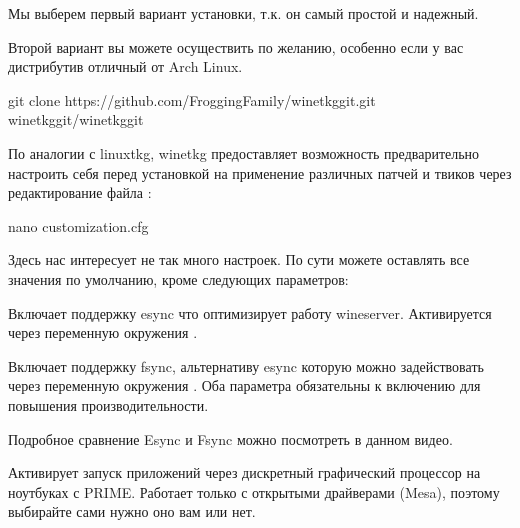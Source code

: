 \documentclass[letterpaper,10pt,russian,openany]{sphinxmanual}
\begin{document}
\sphinxAtStartPar
Мы выберем первый вариант установки, т.к. он самый простой и надежный.

\sphinxAtStartPar
Второй вариант вы можете осуществить по желанию, особенно если у вас дистрибутив отличный от Arch Linux.

\sphinxAtStartPar
{}

\begin{sphinxVerbatim}[commandchars=\\\{\}]
git clone https://github.com/Frogging\PYGZhy{}Family/wine\PYGZhy{}tkg\PYGZhy{}git.git
 wine\PYGZhy{}tkg\PYGZhy{}git/wine\PYGZhy{}tkg\PYGZhy{}git
\end{sphinxVerbatim}

\sphinxAtStartPar
По аналогии с linux\sphinxhyphen{}tkg, wine\sphinxhyphen{}tkg предоставляет возможность предварительно настроить себя перед установкой
на применение различных патчей и твиков через редактирование файла :

\begin{sphinxVerbatim}[commandchars=\\\{\}]
nano customization.cfg
\end{sphinxVerbatim}

\sphinxAtStartPar
Здесь нас интересует не так много настроек.
По сути можете оставлять все значения по умолчанию, кроме следующих параметров:

\sphinxAtStartPar
{} \sphinxhyphen{} Включает поддержку esync что оптимизирует работу wineserver.
Активируется через переменную окружения .

\sphinxAtStartPar
{} \sphinxhyphen{} Включает поддержку fsync, альтернативу esync которую можно задействовать через переменную окружения .
Оба параметра обязательны к включению для повышения производительности.

\sphinxAtStartPar
Подробное сравнение Esync и Fsync можно посмотреть в данном видео.

\sphinxAtStartPar
{}

\sphinxAtStartPar
{} \sphinxhyphen{} Активирует запуск приложений через дискретный графический процессор на ноутбуках с PRIME.
Работает только с открытыми драйверами (Mesa), поэтому выбирайте сами нужно оно вам или нет.
\end{document}
